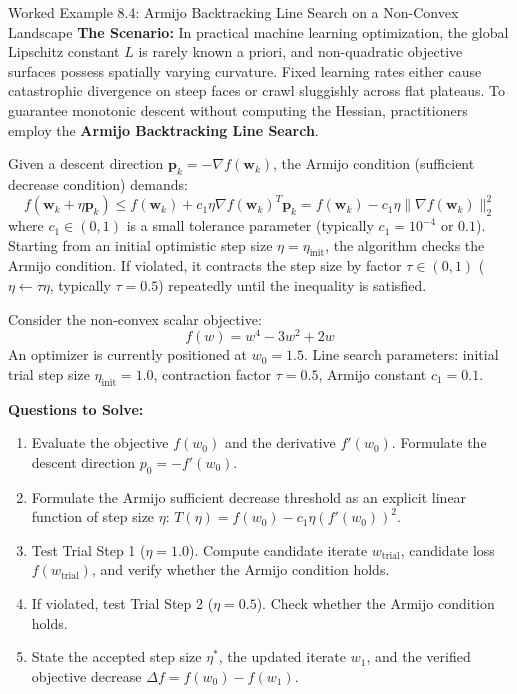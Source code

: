 \begin{examplebox}[breakable]{Worked Example 8.4: Armijo Backtracking Line Search on a Non-Convex Landscape}
\label{ex:w08_armijo_line_search}
\textbf{The Scenario:}
In practical machine learning optimization, the global Lipschitz constant $L$ is rarely known a priori, and non-quadratic objective surfaces possess spatially varying curvature. Fixed learning rates either cause catastrophic divergence on steep faces or crawl sluggishly across flat plateaus.
To guarantee monotonic descent without computing the Hessian, practitioners employ the \textbf{Armijo Backtracking Line Search}.

Given a descent direction $\mathbf{p}_k = -\nabla f(\mathbf{w}_k)$, the Armijo condition (sufficient decrease condition) demands:
\begin{equation*}
f(\mathbf{w}_k + \eta \mathbf{p}_k) \le f(\mathbf{w}_k) + c_1 \eta \nabla f(\mathbf{w}_k)^T \mathbf{p}_k = f(\mathbf{w}_k) - c_1 \eta \|\nabla f(\mathbf{w}_k)\|_2^2
\end{equation*}
where $c_1 \in (0, 1)$ is a small tolerance parameter (typically $c_1 = 10^{-4}$ or $0.1$).
Starting from an initial optimistic step size $\eta = \eta_{\text{init}}$, the algorithm checks the Armijo condition. If violated, it contracts the step size by factor $\tau \in (0, 1)$ ($\eta \leftarrow \tau \eta$, typically $\tau = 0.5$) repeatedly until the inequality is satisfied.

Consider the non-convex scalar objective:
\begin{equation*}
f(w) = w^4 - 3w^2 + 2w
\end{equation*}
An optimizer is currently positioned at $w_0 = 1.5$.
Line search parameters: initial trial step size $\eta_{\text{init}} = 1.0$, contraction factor $\tau = 0.5$, Armijo constant $c_1 = 0.1$.

\textbf{Questions to Solve:}
\begin{enumerate}
    \item Evaluate the objective $f(w_0)$ and the derivative $f'(w_0)$. Formulate the descent direction $p_0 = -f'(w_0)$.
    \item Formulate the Armijo sufficient decrease threshold as an explicit linear function of step size $\eta$: $T(\eta) = f(w_0) - c_1 \eta (f'(w_0))^2$.
    \item Test Trial Step 1 ($\eta = 1.0$). Compute candidate iterate $w_{\text{trial}}$, candidate loss $f(w_{\text{trial}})$, and verify whether the Armijo condition holds.
    \item If violated, test Trial Step 2 ($\eta = 0.5$). Check whether the Armijo condition holds.
    \item State the accepted step size $\eta^*$, the updated iterate $w_1$, and the verified objective decrease $\Delta f = f(w_0) - f(w_1)$.
\end{enumerate}


\end{examplebox}
